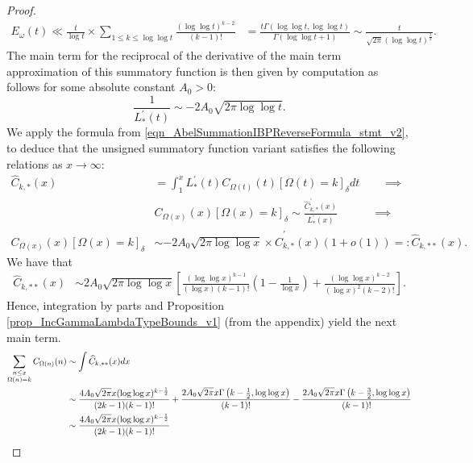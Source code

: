 \documentclass[11pt,reqno,a4letter]{article}
\numberwithin{figure}{section}
\numberwithin{table}{section}
\newcommand{\Iverson}[1]{\ensuremath{\left[#1\right]_{\delta}}}
\theoremstyle{plain}
\numberwithin{theorem}{section}
\theoremstyle{definition}
\begin{document}
\begin{proof}
\begin{align*}
E_{\omega}(t) \ll \frac{t}{\log t} \times \sum_{1 \leq k \leq \log\log t} \frac{(\log\log t)^{k-2}}{(k-1)!} & = 
     \frac{t \Gamma(\log\log t, \log\log t)}{\Gamma(\log\log t + 1)} 
     \sim \frac{t}{\sqrt{2\pi} (\log\log t)^{\frac{3}{2}}}. 
\end{align*}
The main term for the reciprocal of the derivative of the main term approximation of this 
summatory function is then given by computation as follows for some absolute constant $A_0 > 0$: 
\[
\frac{1}{L_{\ast}^{\prime}(t)} \sim -2A_0 \sqrt{2\pi \log\log t}. 
\]
We apply the formula from \eqref{eqn_AbelSummationIBPReverseFormula_stmt_v2},  
to deduce that the unsigned summatory function variant satisfies the following 
relations as $x \rightarrow \infty$: 
\begin{align*} 
     \widehat{C}_{k,\ast}(x) & = \int_1^{x} L_{\ast}^{\prime}(t) C_{\Omega(t)}(t) \Iverson{\Omega(t) = k} 
     dt \qquad \implies \\ 
     & 
     C_{\Omega(x)}(x) \Iverson{\Omega(x) = k} 
     \sim \frac{\widehat{C}_{k,\ast}^{\prime}(x)}{L_{\ast}^{\prime}(x)} \qquad\quad \implies \\ 
     C_{\Omega(x)}(x) \Iverson{\Omega(x) = k} & \sim 
     -2A_0 \sqrt{2\pi \log\log x} \times \widehat{C}_{k,\ast}^{\prime}(x) (1+o(1)) 
     =: \widehat{C}_{k,\ast\ast}(x). 
\end{align*} 
We have that 
\begin{align*}
     \widehat{C}_{k,\ast\ast}(x) & \sim 
     2A_0 \sqrt{2\pi \log\log x}\left[ 
     \frac{(\log\log x)^{k-1}}{(\log x) (k-1)!} \left( 
     1 - \frac{1}{\log x}\right) + 
     \frac{(\log\log x)^{k-2}}{(\log x)^2 (k-2)!}\right]. 
\end{align*} 
Hence, integration by parts and Proposition \ref{prop_IncGammaLambdaTypeBounds_v1} 
(from the appendix) yield the next main term. 
\begin{align}
\label{eqn_proofTag_CkAstAstHatx_DerivativeFormula_NeedsIBP_v1} 
\sum_{\substack{n \leq x \\ \Omega(n)=k}} C_{\Omega(n)}(n) & \sim
     \int \widehat{C}_{k,\ast\ast}(x)dx \\ 
\notag
     & \sim 
     \frac{4A_0\sqrt{2\pi} x (\log\log x)^{k-\frac{1}{2}}}{(2k-1) (k-1)!} + 
     \frac{2A_0\sqrt{2\pi} x \Gamma\left(k - \frac{1}{2}, \log\log x\right)}{(k-1)!} - 
     \frac{2A_0\sqrt{2\pi} x \Gamma\left(k - \frac{3}{2}, \log\log x\right)}{(k-1)!} \\ 
     & \sim \frac{4A_0\sqrt{2\pi} x (\log\log x)^{k-\frac{1}{2}}}{(2k-1) (k-1)!} 
     \qedhere 
\end{align}
\end{proof}
\end{document}
